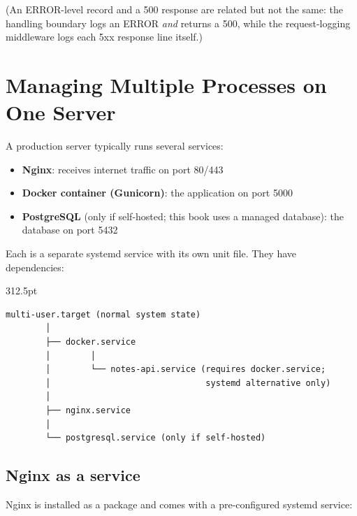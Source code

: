 \noindent{}(An ERROR-level record and a 500 response are related but not the same: the handling boundary logs an ERROR \emph{and} returns a 500, while the request-logging middleware logs each 5xx response line itself.)

\setcounter{section}{4}
\section{Managing Multiple Processes on One Server}\label{25-process-management:255-managing-multiple-processes-on-one-server}

A production server typically runs several services:

\begin{itemize}
\tightlist
\item
  \textbf{Nginx}: receives internet traffic on port 80/443
\item
  \textbf{Docker container (Gunicorn)}: the application on port 5000
\item
  \textbf{PostgreSQL} (only if self-hosted; this book uses a managed database): the database on port 5432
\end{itemize}

\noindent{}Each is a separate systemd service with its own unit file. They have dependencies:

\begin{diagrambox}[short]{312.5pt}
\begin{Verbatim}[fontsize=\fontsize{9.0}{8.55}\selectfont]
multi-user.target (normal system state)
        │
        ├── docker.service
        │        │
        │        └── notes-api.service (requires docker.service;
        │                               systemd alternative only)
        │
        ├── nginx.service
        │
        └── postgresql.service (only if self-hosted)
\end{Verbatim}
\end{diagrambox}

\subsection*{Nginx as a service}\label{25-process-management:nginx-as-a-service}

Nginx is installed as a package and comes with a pre-configured systemd service:

\begin{codebox}[short]

\begin{Shaded}
\begin{Highlighting}[]
\end{Highlighting}
\end{Shaded}

\end{codebox}

